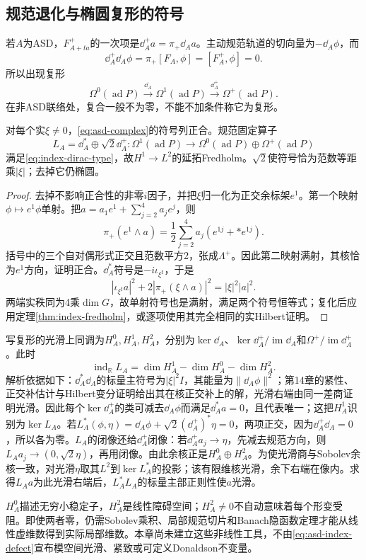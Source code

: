 \subsection{规范退化与椭圆复形的符号}
若$A$为ASD，$F_{A+ta}^+$的一次项是$\dd_A^+a=\pi_+\dd_Aa$。主动规范轨道的切向量为$-\dd_A\phi$，而
\[
 \dd_A^+\dd_A\phi=\pi_+[F_A,\phi]=[F_A^+,\phi]=0.
\]
所以出现复形
\begin{equation}\label{eq:asd-complex}
 \Omega^0(\operatorname{ad}P)\xrightarrow{\dd_A}
 \Omega^1(\operatorname{ad}P)\xrightarrow{\dd_A^+}
 \Omega^+(\operatorname{ad}P).
\end{equation}
在非ASD联络处，复合一般不为零，不能不加条件称它为复形。

\begin{proposition}\label{prop:asd-symbol}
对每个实$\xi\ne0$，\eqref{eq:asd-complex}的符号列正合。规范固定算子
\[
 L_A=\dd_A^*\oplus\sqrt2\dd_A^+:
 \Omega^1(\operatorname{ad}P)\longrightarrow
 \Omega^0(\operatorname{ad}P)\oplus\Omega^+(\operatorname{ad}P)
\]
满足\eqref{eq:index-dirac-type}，故$H^1\to L^2$的延拓Fredholm。$\sqrt2$使符号恰为范数等距乘$|\xi|$；去掉它仍椭圆。
\end{proposition}
\begin{proof}
去掉不影响正合性的非零$i$因子，并把$\xi$归一化为正交余标架$e^1$。第一个映射$\phi\mapsto e^1\phi$单射。把$a=a_1e^1+\sum_{j=2}^4a_je^j$，则
\[
 \pi_+(e^1\wedge a)=\frac12\sum_{j=2}^4a_j(e^{1j}+*e^{1j}).
\]
括号中的三个自对偶形式正交且范数平方2，张成$\Lambda^+$。因此第二映射满射，其核恰为$e^1$方向，证明正合。$\dd_A^*$符号是$-i\iota_{\xi^\sharp}$，于是
\[
 |\iota_{\xi^\sharp}a|^2+2|\pi_+(\xi\wedge a)|^2
 =|\xi|^2|a|^2.
\]
两端实秩同为4乘$\dim G$，故单射符号也是满射，满足两个符号恒等式；复化后应用定理\ref{thm:index-fredholm}，或逐项使用其完全相同的实Hilbert证明。
\end{proof}

写复形的光滑上同调为$H_A^0,H_A^1,H_A^2$，分别为$\ker\dd_A$、$\ker\dd_A^+/\operatorname{im}\dd_A$和$\Omega^+/\operatorname{im}\dd_A^+$。此时
\begin{equation}\label{eq:asd-index-defect}
 \operatorname{ind}_{\mathbb R}L_A
 =\dim H_A^1-\dim H_A^0-\dim H_A^2.
\end{equation}
解析依据如下：$\dd_A^*\dd_A$的标量主符号为$|\xi|^2I$，其能量为$\|\dd_A\phi\|^2$；第14章的紧性、正交补估计与Hilbert变分证明给出其在核正交补上的解，光滑右端由同一差商证明光滑。因此每个$\ker\dd_A^+$的类可减去$\dd_A\phi$而满足$\dd_A^*a=0$，且代表唯一；这把$H_A^1$识别为$\ker L_A$。若$L_A^*(\phi,\eta)=\dd_A\phi+\sqrt2(\dd_A^+)^*\eta=0$，两项正交，因为$\dd_A^+\dd_A=0$，所以各为零。$L_A$的闭像还给$\dd_A^+$闭像：若$\dd_A^+a_j\to\eta$，先减去规范方向，则$L_Aa_j\to(0,\sqrt2\eta)$，再用闭像。由此余核正是$H_A^0\oplus H_A^2$。为使光滑商与Sobolev余核一致，对光滑$\eta$取其$L^2$到$\ker L_A^*$的投影；该有限维核光滑，余下右端在像内。求得$L_Aa$为此光滑右端后，$L_A^*L_A$的标量主部正则性使$a$光滑。

$H_A^0$描述无穷小稳定子，$H_A^2$是线性障碍空间；$H_A^2\ne0$不自动意味着每个形变受阻。即使两者零，仍需Sobolev乘积、局部规范切片和Banach隐函数定理才能从线性虚维数得到实际局部维数。本章尚未建立这些非线性工具，不由\eqref{eq:asd-index-defect}宣布模空间光滑、紧致或可定义Donaldson不变量。
